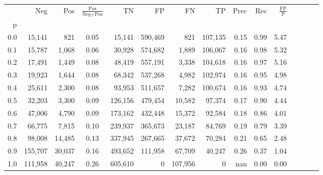 \begin{tabular}{rrrcrrrrrrrrrrr}
\toprule
{} &      Neg &     Pos & $\frac{\text{Pos}}{\text{Neg}+\text{Pos}}$ &       TN &       FP &       FN &       TP &  Prec &   Rec & $\frac{\text{FP}}{\text{P}}$ \\
p   &          &         &                                            &          &          &          &          &       &       &                              \\
\midrule
0.0 &   15,141 &     821 &                                       0.05 &   15,141 &  590,469 &      821 &  107,135 &  0.15 &  0.99 &                         5.47 \\
0.1 &   15,787 &   1,068 &                                       0.06 &   30,928 &  574,682 &    1,889 &  106,067 &  0.16 &  0.98 &                         5.32 \\
0.2 &   17,491 &   1,449 &                                       0.08 &   48,419 &  557,191 &    3,338 &  104,618 &  0.16 &  0.97 &                         5.16 \\
0.3 &   19,923 &   1,644 &                                       0.08 &   68,342 &  537,268 &    4,982 &  102,974 &  0.16 &  0.95 &                         4.98 \\
0.4 &   25,611 &   2,300 &                                       0.08 &   93,953 &  511,657 &    7,282 &  100,674 &  0.16 &  0.93 &                         4.74 \\
0.5 &   32,203 &   3,300 &                                       0.09 &  126,156 &  479,454 &   10,582 &   97,374 &  0.17 &  0.90 &                         4.44 \\
0.6 &   47,006 &   4,790 &                                       0.09 &  173,162 &  432,448 &   15,372 &   92,584 &  0.18 &  0.86 &                         4.01 \\
0.7 &   66,775 &   7,815 &                                       0.10 &  239,937 &  365,673 &   23,187 &   84,769 &  0.19 &  0.79 &                         3.39 \\
0.8 &   98,008 &  14,485 &                                       0.13 &  337,945 &  267,665 &   37,672 &   70,284 &  0.21 &  0.65 &                         2.48 \\
0.9 &  155,707 &  30,037 &                                       0.16 &  493,652 &  111,958 &   67,709 &   40,247 &  0.26 &  0.37 &                         1.04 \\
1.0 &  111,958 &  40,247 &                                       0.26 &  605,610 &        0 &  107,956 &        0 &   nan &  0.00 &                         0.00 \\
\bottomrule
\end{tabular}
